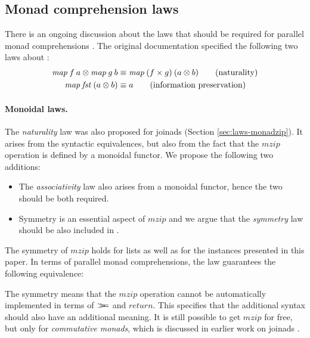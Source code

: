 \documentclass{sigplanconf}
\newcommand{\Varid}[1]{\mathit{#1}}
\newcommand{\bind}{\mathbin{>\!\!\!>\mkern-6.7mu=}}
\def\resethooks{%
  \global\let\SaveRestoreHook\empty
  \global\let\ColumnHook\empty}
\let\hspre\empty
\let\hspost\empty
\begin{document}

\subsection{Monad comprehension laws} 
\label{sec:proposals-mzip}

There is an ongoing discussion about the laws that should be required for parallel monad 
comprehensions \cite{bringbackmc, comprefun}. The original documentation specified the following two laws
about :
\begin{align*}
  \map \: f \: a \mzip \map \: g \: b &\equiv \map \: (f \times g) \: (a \mzip b) \tag{naturality} \\
  \map \: \Varid{fst} \: (a \mzip b) &\equiv a \tag{information preservation} 
\end{align*}

\paragraph{Monoidal laws.}
The \textit{naturality} law was also proposed for joinads (Section \ref{sec:laws-monadzip}). It
arises from the syntactic equivalences, but also from the fact that the \ensuremath{\Varid{mzip}} operation is defined by a 
monoidal functor. We propose the following two additions:

\begin{itemize}
\item The \textit{associativity} law also arises from a monoidal functor,
  hence the two should be both required.
  
\item Symmetry is an essential aspect of \ensuremath{\Varid{mzip}} and we argue that 
  the \textit{symmetry} law should be also included in .

\end{itemize}
The symmetry of \ensuremath{\Varid{mzip}} holds for lists as well as for the  instances presented in 
this paper. In terms of parallel monad comprehensions, the law guarantees the following 
equivalence:
\resethooks
The symmetry means that the \ensuremath{\Varid{mzip}} operation cannot be automatically implemented in 
terms of \ensuremath{\bind } and \ensuremath{\Varid{return}}. This specifies that the additional syntax
should also have an additional meaning. It is still possible to get \ensuremath{\Varid{mzip}} for free, 
but only for \textit{commutative monads}, which is discussed in earlier work on 
joinads \cite{joinads}.
\end{document}
